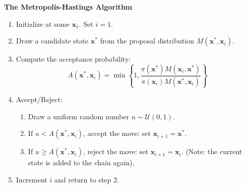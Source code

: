 \begin{algorithmBox}
    \textbf{The Metropolis-Hastings Algorithm}
    \begin{enumerate}
        \item Initialize at some $\mathbf{x}_1$. Set $i=1$.
        \item Draw a candidate state $\mathbf{x}^*$ from the proposal distribution $M(\mathbf{x}^*, \mathbf{x}_i)$.
        \item Compute the acceptance probability:
              \begin{equation}
                  A(\mathbf{x}^*, \mathbf{x}_i) = \min \left\{ 1, \frac{\pi(\mathbf{x}^*) M(\mathbf{x}_i, \mathbf{x}^*)}{\pi(\mathbf{x}_i) M(\mathbf{x}^*, \mathbf{x}_i)} \right\}
              \end{equation}
        \item Accept/Reject:
            \begin{enumerate}
                \item Draw a uniform random number $u \sim \mathcal{U}(0,1)$.
                \item If $u < A(\mathbf{x}^*, \mathbf{x}_i)$, accept the move: set $\mathbf{x}_{i+1} = \mathbf{x}^*$.
                \item If $u \geq A(\mathbf{x}^*, \mathbf{x}_i)$, reject the move: set $\mathbf{x}_{i+1} = \mathbf{x}_i$. (Note: the current state is added to the chain again).
            \end{enumerate}
        \item Increment $i$ and return to step 2.
    \end{enumerate}
\end{algorithmBox}

